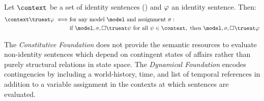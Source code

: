 \documentclass[../LogosReference.tex]{subfiles}
\begin{document}
\begin{definition}\label{def:consequence-consequence}
Let $\context$ be a set of identity sentences () and $\varphi$ an identity sentence.
Then:
\begin{align*}
	\context \trueat \metaA \iff
	& \text{for any model } \model \text{ and assignment } \assignment : \\
	& \text{if } \model, \assignment, \nullstate \trueat \metaB \text{ for all } \metaB \in \context, \text{ then } \model, \assignment, \nullstate \trueat \metaA
\end{align*}
\end{definition}

\begin{remark}
The \textit{Constitutive Foundation} does not provide the semantic resources to evaluate non-identity sentences which depend on contingent states of affairs rather than purely structural relations in state space.
The \textit{Dynamical Foundation} encodes contingencies by including a world-history, time, and list of temporal references in addition to a variable assignment in the contexts at which sentences are evaluated.
\end{remark}
\end{document}
